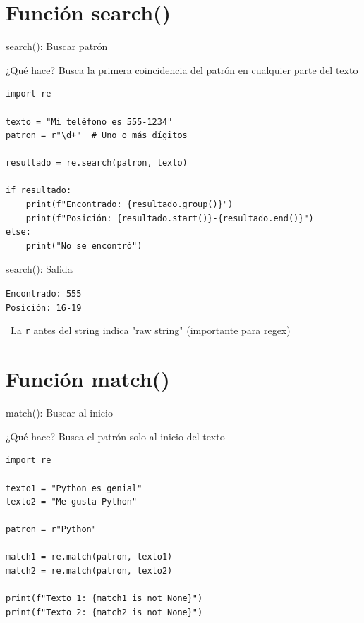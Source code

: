 \documentclass{beamer}
\begin{document}
\section{Función search()}

\begin{frame}[fragile]{search(): Buscar patrón \faSearch}
\begin{conceptbox}{¿Qué hace?}
Busca la primera coincidencia del patrón en cualquier parte del texto
\end{conceptbox}

\begin{lstlisting}
import re

texto = "Mi teléfono es 555-1234"
patron = r"\d+"  # Uno o más dígitos

resultado = re.search(patron, texto)

if resultado:
    print(f"Encontrado: {resultado.group()}")
    print(f"Posición: {resultado.start()}-{resultado.end()}")
else:
    print("No se encontró")
\end{lstlisting}
\end{frame}

\begin{frame}[fragile]{search(): Salida \faArrowCircleRight}
\begin{tcolorbox}[colback=green!10,colframe=green,title={\small\faArrowCircleRight \ Salida},coltitle=fg0,left=3pt,right=3pt,top=3pt,bottom=3pt,boxsep=2pt]
\small\texttt{Encontrado: 555\\
Posición: 16-19}
\end{tcolorbox}

\vspace{0.3cm}
\begin{notebox}
\small\faInfoCircle\ La \texttt{r} antes del string indica "raw string" (importante para regex)
\end{notebox}
\end{frame}

\section{Función match()}

\begin{frame}[fragile]{match(): Buscar al inicio \faAlignLeft}
\begin{conceptbox}{¿Qué hace?}
Busca el patrón solo al inicio del texto
\end{conceptbox}

\begin{lstlisting}
import re

texto1 = "Python es genial"
texto2 = "Me gusta Python"

patron = r"Python"

match1 = re.match(patron, texto1)
match2 = re.match(patron, texto2)

print(f"Texto 1: {match1 is not None}")
print(f"Texto 2: {match2 is not None}")
\end{lstlisting}
\end{frame}
\end{document}
